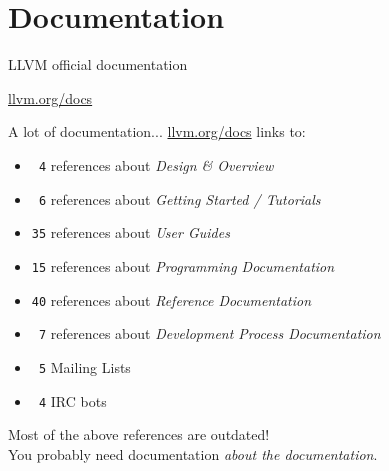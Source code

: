 
\section{Documentation}
\begin{frame}[t]{LLVM official documentation}
  \begin{center}
    \begin{Huge}
      \vfill
      \href{http://llvm.org/docs}{llvm.org/docs}
      \vfill
    \end{Huge}
  \end{center}
\end{frame}


\begin{frame}[t]{A lot of documentation...}
  \href{http://llvm.org/docs}{llvm.org/docs} links to:
  \begin{itemize}
    \item \texttt{\ 4} references about \textit{Design \& Overview}
    \item \texttt{\ 6} references about \textit{Getting Started / Tutorials}
    \item \texttt{35} references about \textit{User Guides}
    \item \texttt{15} references about \textit{Programming Documentation}
    \item \texttt{40} references about \textit{Reference Documentation}
    \item \texttt{\ 7} references about \textit{Development Process Documentation}
    \item \texttt{\ 5} Mailing Lists
    \item \texttt{\ 4} IRC bots
  \end{itemize}
  \vfill
  Most of the above references are \alert{outdated}!\\
  \medskip
  You probably need documentation \emph{about the documentation}.
  \vfill
\end{frame}


